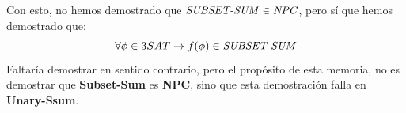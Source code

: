 \documentclass[../main]{subfiles}
\begin{document}
Con esto, no hemos demostrado que \textbf{$\text{\textit{SUBSET-SUM}} \in \text{\textit{NPC}}$}, pero sí que hemos demostrado que:\vspace{2mm}
\begin{equation*}
    \forall \phi \in 3SAT \rightarrow f(\phi) \in \text{\textit{SUBSET-SUM}}\vspace{2mm}
\end{equation*}
Faltaría demostrar en sentido contrario, pero el propósito de esta memoria, no es demostrar que \textbf{Subset-Sum} es \textbf{NPC}, sino que esta demostración falla en \textbf{Unary-Ssum}.
\end{document}
